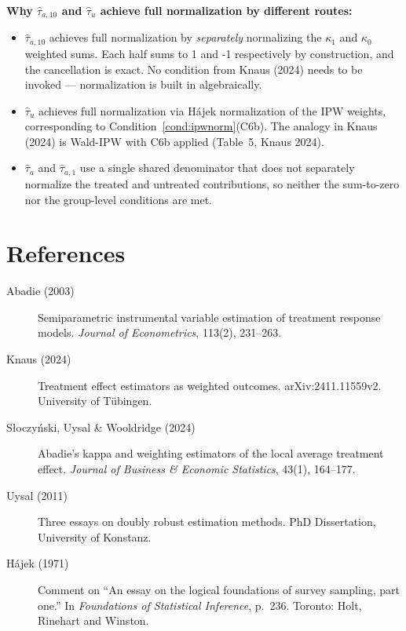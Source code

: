 \documentclass[12pt, a4paper]{article}
\theoremstyle{condstyle}
\theoremstyle{plain}
\newcommand{\that}[1]{\hat{\tau}_{#1}}
\begin{document}
\medskip
\noindent\textbf{Why $\that{a,10}$ and $\that{u}$ achieve full normalization by different routes:}
\begin{itemize}
  \item $\that{a,10}$ achieves full normalization by \emph{separately} normalizing the $\kappa_1$
        and $\kappa_0$ weighted sums.
        Each half sums to 1 and -1 respectively by construction, and the cancellation is exact.
        No condition from Knaus (2024) needs to be invoked --- normalization is built in algebraically.
  \item $\that{u}$ achieves full normalization via Hájek normalization of the IPW weights,
        corresponding to Condition~\ref{cond:ipwnorm}(C6b).
        The analogy in Knaus (2024) is Wald-IPW with C6b applied (Table~5, Knaus 2024).
  \item $\that{a}$ and $\that{a,1}$ use a single shared denominator that does not separately
        normalize the treated and untreated contributions, so neither the sum-to-zero
        nor the group-level conditions are met.
\end{itemize}

\section*{References}

\begin{description}
  \item[Abadie (2003)] Semiparametric instrumental variable estimation of treatment response models.
        \textit{Journal of Econometrics}, 113(2), 231--263.

  \item[Knaus (2024)] Treatment effect estimators as weighted outcomes.
        arXiv:2411.11559v2. University of Tübingen.

  \item[Słoczy\'nski, Uysal \& Wooldridge (2024)] Abadie's kappa and weighting estimators
        of the local average treatment effect.
        \textit{Journal of Business \& Economic Statistics}, 43(1), 164--177.

  \item[Uysal (2011)] Three essays on doubly robust estimation methods.
        PhD Dissertation, University of Konstanz.

  \item[Hájek (1971)] Comment on ``An essay on the logical foundations of survey sampling, part one.''
        In \textit{Foundations of Statistical Inference}, p.~236. Toronto: Holt, Rinehart and Winston.
\end{description}
\end{document}
